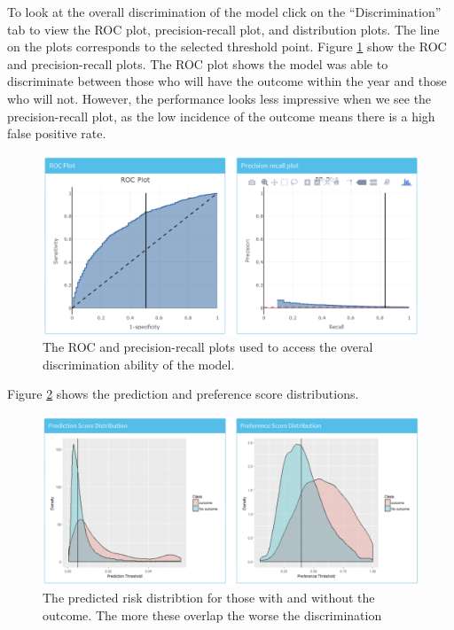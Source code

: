 \documentclass[11pt]{book}
\theoremstyle{definition}
\theoremstyle{definition}
\theoremstyle{definition}
\theoremstyle{remark}
\begin{document}
To look at the overall discrimination of the model click on the ``Discrimination'' tab to view the ROC plot, precision-recall plot, and distribution plots. The line on the plots corresponds to the selected threshold point. Figure \ref{fig:shinyPerformanceDisc} show the ROC and precision-recall plots. The ROC plot shows the model was able to discriminate between those who will have the outcome within the year and those who will not. However, the performance looks less impressive when we see the precision-recall plot, as the low incidence of the outcome means there is a high false positive rate.

\begin{figure}

{\centering \includegraphics[width=1\linewidth]{images/PatientLevelPrediction/shiny/shinyPerformanceDisc} 

}

\caption{The ROC and precision-recall plots used to access the overal discrimination ability of the model.}\label{fig:shinyPerformanceDisc}
\end{figure}

Figure \ref{fig:shinyPerformanceDist} shows the prediction and preference score distributions.

\begin{figure}

{\centering \includegraphics[width=1\linewidth]{images/PatientLevelPrediction/shiny/shinyPerformanceDist} 

}

\caption{The predicted risk distribtion for those with and without the outcome. The more these overlap the worse the discrimination}\label{fig:shinyPerformanceDist}
\end{figure}
\end{document}
